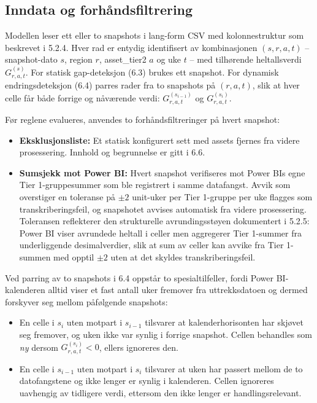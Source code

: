 \documentclass[a4paper,11pt]{article}
\begin{document}
\subsection{Inndata og forhåndsfiltrering}

Modellen leser ett eller to snapshots i lang-form CSV med kolonnestruktur som beskrevet i 5.2.4. Hver rad er entydig identifisert av kombinasjonen $(s, r, a, t)$ – snapshot-dato $s$, region $r$, asset\_tier2 $a$ og uke $t$ – med tilhørende heltallsverdi $G_{r,a,t}^{(s)}$. For statisk gap-deteksjon (6.3) brukes ett snapshot. For dynamisk endringsdeteksjon (6.4) parres rader fra to snapshots på $(r, a, t)$, slik at hver celle får både forrige og nåværende verdi: $G_{r,a,t}^{(s_{i-1})}$ og $G_{r,a,t}^{(s_i)}$.

Før reglene evalueres, anvendes to forhåndsfiltreringer på hvert snapshot:

\begin{itemize}
\item \textbf{Eksklusjonsliste:} Et statisk konfigurert sett med assets fjernes fra videre prosessering. Innhold og begrunnelse er gitt i 6.6.
\item \textbf{Sumsjekk mot Power BI:} Hvert snapshot verifiseres mot Power BIs egne Tier 1-gruppesummer som ble registrert i samme datafangst. Avvik som overstiger en toleranse på $\pm 2$ unit-uker per Tier 1-gruppe per uke flagges som transkriberingsfeil, og snapshotet avvises automatisk fra videre prosessering. Toleransen reflekterer den strukturelle avrundingsstøyen dokumentert i 5.2.5: Power BI viser avrundede heltall i celler men aggregerer Tier 1-summer fra underliggende desimalverdier, slik at sum av celler kan avvike fra Tier 1-summen med opptil $\pm 2$ uten at det skyldes transkriberingsfeil.
\end{itemize}

Ved parring av to snapshots i 6.4 oppstår to spesialtilfeller, fordi Power BI-kalenderen alltid viser et fast antall uker fremover fra uttrekksdatoen og dermed forskyver seg mellom påfølgende snapshots:

\begin{itemize}
\item En celle i $s_i$ uten motpart i $s_{i-1}$ tilsvarer at kalenderhorisonten har skjøvet seg fremover, og uken ikke var synlig i forrige snapshot. Cellen behandles som \textit{ny} dersom $G_{r,a,t}^{(s_i)} < 0$, ellers ignoreres den.
\item En celle i $s_{i-1}$ uten motpart i $s_i$ tilsvarer at uken har passert mellom de to datofangstene og ikke lenger er synlig i kalenderen. Cellen ignoreres uavhengig av tidligere verdi, ettersom den ikke lenger er handlingsrelevant.
\end{itemize}
\end{document}
